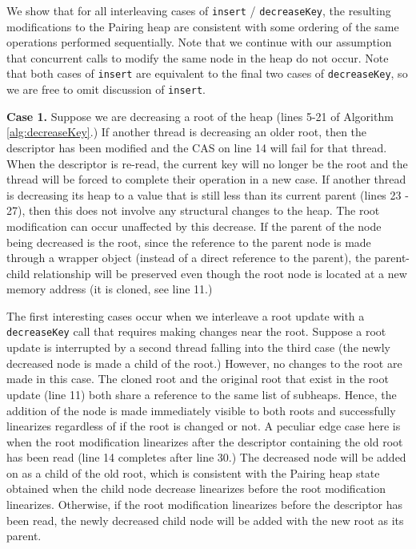 \documentclass{acm_proc_article-sp}
\begin{document}
We show that for all interleaving cases of \texttt{insert} / \texttt{decreaseKey},
the resulting modifications to the Pairing heap are consistent with some
ordering of the same operations performed sequentially.
Note that we continue with our assumption that concurrent calls
to modify the same node in the heap do not occur. Note that both cases
of \texttt{insert} are equivalent to the final two cases
of \texttt{decreaseKey}, so we are free to omit discussion of \texttt{insert}.

\textbf{Case 1.} 
Suppose we are decreasing a root of the heap (lines 5-21 of Algorithm \ref{alg:decreaseKey}.)
If another thread is decreasing an older root, then the descriptor
has been modified and the CAS on line 14 will fail for that thread.
When the descriptor is re-read, the
current key will no longer be the root and the thread will be forced
to complete their operation in a new case. If another thread is decreasing its heap
to a value that is still less than its current parent (lines 23 - 27), then
this does not involve any structural changes to the heap. The root modification
can occur unaffected by this decrease. If the parent of the node being
decreased is the root, since the reference to the parent node is made through
a wrapper object (instead of a direct reference to the parent), the parent-child
relationship will be preserved even though the root node is located at a
new memory address (it is cloned, see line 11.)

The first interesting cases occur when we interleave a root update
with a \texttt{decreaseKey} call that
requires making changes near the root. Suppose a root update is interrupted by
a second thread falling into the third case (the newly decreased node is made
a child of the root.) However, no changes to the root are made in this case. The cloned
root and the original root that exist in the root update (line 11) both share a 
reference to the same list of subheaps. Hence, the addition of the node is
made immediately visible to both roots and successfully linearizes regardless of
if the root is changed or not. A peculiar edge case here is when the root
modification linearizes after the descriptor containing the old root
has been read (line 14 completes after line 30.) The decreased node will
be added on as a child of the old root, which is consistent with the Pairing heap state
obtained when the child node decrease linearizes before the root modification linearizes.
Otherwise, if the root modification linearizes before the descriptor has been read, the
newly decreased child node will be added with the new root as its parent.
\end{document}
